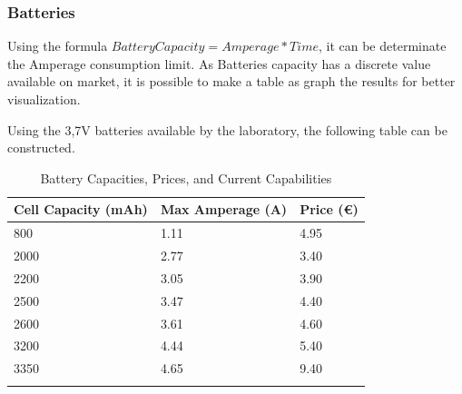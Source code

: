




\subsubsection{Batteries}

Using the formula \( Battery Capacity = Amperage * Time\), it can be determinate the 
Amperage consumption limit. As Batteries capacity has a discrete value available on market,
it is possible to make a table as graph the results for better visualization.

Using the 3,7V batteries available by the laboratory, the following table can be constructed. 
\begin{table}[h!]
    \centering
    \begin{tabular}{l|l|l}
        \textbf{Cell Capacity (mAh)} & \textbf{Max Amperage (A)} & \textbf{Price (€)} \\
        \hline
        \arrayrulecolor[gray]{0.85}
        800  & 1.11 & 4.95 \\
        \hline
        2000 & 2.77 & 3.40 \\
        \hline
        2200 & 3.05 & 3.90 \\
        \hline
        2500 & 3.47 & 4.40 \\
        \hline
        2600 & 3.61 & 4.60 \\
        \hline
        3200 & 4.44 & 5.40 \\
        \hline
        3350 & 4.65 & 9.40 \\
        \arrayrulecolor{black}
    \end{tabular}
    \caption{Battery Capacities, Prices, and Current Capabilities}
    \label{table:battery_capacities}
\end{table}


